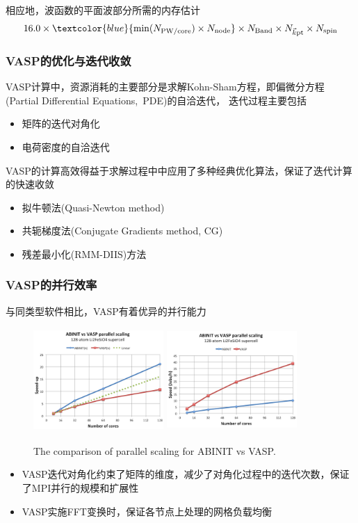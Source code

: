 {{	相应地，波函数的平面波部分所需的内存估计
				\begin{displaymath}
					16.0\times \textcolor{blue}{\min(N_{\mathrm{PW/core}})\times N_{\mathrm{node}}} \times N_{\mathrm{Band}}\times N_{\vec k\mathrm{pt}}\times N_{\mathrm{spin}}
				\end{displaymath}
}

\frame
{
	\frametitle{\textrm{VASP}的优化与迭代收敛}
	\textrm{VASP}计算中，资源消耗的主要部分是求解\textrm{Kohn-Sham}方程，即偏微分方程\textrm{(Partial Differential Equations,~PDE)}的自洽迭代， 迭代过程主要包括
	\begin{itemize}
		\item 矩阵的迭代对角化
		\item 电荷密度的自洽迭代
	\end{itemize}

	\vskip 10pt
	\textrm{VASP}的计算高效得益于求解过程中中应用了多种经典优化算法，保证了迭代计算的快速收敛
	\begin{itemize} 
		\item 拟牛顿法\textrm{(Quasi-Newton method)}
		\item 共轭梯度法\textrm{(Conjugate Gradients method, CG)}
		\item 残差最小化\textrm{(RMM-DIIS)}方法
	\end{itemize}
}

\frame
{
	\frametitle{\textrm{VASP}的并行效率}
	与同类型软件相比，\textrm{VASP}有着优异的并行能力
\begin{figure}[h!]
	\vspace{-0.15in}
\centering
\includegraphics[height=1.55in,width=1.95in,viewport=0 0 240 200,clip]{Figures/VASP-abinit_Li128-1.png}
\includegraphics[height=1.55in,width=1.95in,viewport=0 0 240 200,clip]{Figures/VASP-abinit_Li128-2.png}
\caption{\tiny \textrm{The comparison of parallel scaling for ABINIT vs VASP.}}%
\label{ABINIT_vs_VASP}
\end{figure} 
\begin{itemize}
	\item \textrm{VASP}迭代对角化约束了矩阵的维度，减少了对角化过程中的迭代次数，保证了\textrm{MPI}并行的规模和扩展性
	\item \textrm{VASP}实施\textrm{FFT}变换时，保证各节点上处理的网格负载均衡
\end{itemize}
}

}
